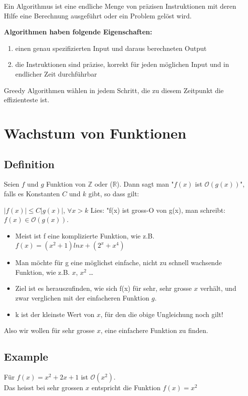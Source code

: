\documentclass[12pt]{scrartcl}
\begin{document}
Ein Algorithmus ist eine endliche Menge von präzisen Instruktionen mit deren Hilfe
eine Berechnung ausgeführt oder ein Problem gelöst wird.

\textbf{Algorithmen haben folgende Eigenschaften:}
\begin{enumerate}
    \item einen genau spezifizierten Input und daraus berechneten Output
    \item die Instruktionen sind präzise, korrekt für jeden möglichen Input und in endlicher Zeit durchführbar
\end{enumerate}


Greedy Algorithmen wählen in jedem Schritt, die zu diesem Zeitpunkt die effizienteste ist.


\newpage
\section{Wachstum von Funktionen}

\subsection{Definition}
Seien $f$ und $g$ Funktion von $\mathbb{Z}$ oder ($\mathbb{R}$). Dann sagt man "$f(x)$ ist $\mathcal{O}(g(x))$", falls es
Konstanten $C$ und $k$ gibt, so dass gilt:

$|f(x)| \leq C|g(x)|$, $\forall x > k$ Lies: "f(x) ist gross-O von g(x), man schreibt: $f(x) \in \mathcal{O}(g(x))$.

\begin{itemize}
    \item Meist ist f eine komplizierte Funktion, wie z.B. $f(x) = (x^2 + 1) ln x + (2^x + x^4)$
    \item Man möchte für g eine möglichst einfache, nicht zu schnell wachsende Funktion, wie z.B. $x$, $x^2$ \dots
    \item Ziel ist es herauszufinden, wie sich f(x) für sehr, sehr grosse $x$ verhält, und zwar verglichen mit der einfacheren Funktion $g$.
    \item k ist der kleinste Wert von $x$, für den die obige Ungleichung noch gilt!
\end{itemize}

Also wir wollen für sehr grosse $x$, eine einfachere Funktion zu finden.


\subsection{Example}
Für $f(x) = x^2 + 2x + 1$ ist $\mathcal{O}(x^2)$.\\
Das heisst bei sehr grossen $x$ entspricht die Funktion $f(x) =  x^2$
\end{document}
